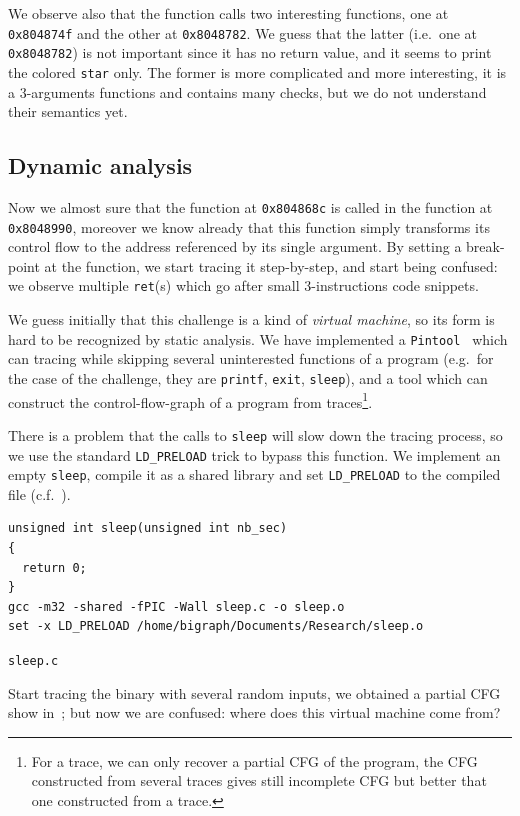 \documentclass{easychair}
\begin{document}
We observe also that the function calls two interesting functions, one at \texttt{0x804874f} and the other at \texttt{0x8048782}. We guess that the latter (i.e.~one at \texttt{0x8048782}) is not important since it has no return value, and it seems to print the colored \texttt{star} only. The former is more complicated and more interesting, it is a $3$-arguments functions and contains many checks, but we do not understand their semantics yet.

\subsection{Dynamic analysis}
\label{sec:dynamic_analysis_quick}
Now we almost sure that the function at \texttt{0x804868c} is called in the function at \texttt{0x8048990}, moreover we know already that this function simply transforms its control flow to the address referenced by its single argument. By setting a break-point at the function, we start tracing it step-by-step, and start being confused: we observe multiple \texttt{ret}(s) which go after small $3$-instructions code snippets. 

We guess initially that this challenge is a kind of \emph{virtual machine}, so its form is hard to be recognized by static analysis. We have implemented a \texttt{Pintool}~\autocite{LukCMPKLWRH05} which can tracing while skipping several uninterested functions of a program (e.g.~for the case of the challenge, they are \texttt{printf}, \texttt{exit}, \texttt{sleep}), and a tool which can construct the control-flow-graph of a program from traces\footnote{For a trace, we can only recover a partial CFG of the program, the CFG constructed from several traces gives still incomplete CFG but better that one constructed from a trace.}.

There is a problem that the calls to \texttt{sleep} will slow down the tracing process, so we use the standard \texttt{LD\_PRELOAD} trick to bypass this function. We implement an empty \texttt{sleep}, compile it as a shared library and set \texttt{LD\_PRELOAD} to the compiled file (c.f.~).
\begin{listing}
  \begin{verbatim}
unsigned int sleep(unsigned int nb_sec)
{
  return 0;
}
gcc -m32 -shared -fPIC -Wall sleep.c -o sleep.o
set -x LD_PRELOAD /home/bigraph/Documents/Research/sleep.o
  \end{verbatim}
  \caption{\texttt{sleep.c}}
  \label{fig:sleep}
\end{listing}
Start tracing the binary with several random inputs, we obtained a partial CFG show in~; but now we are confused: where does this virtual machine come from? 
\end{document}
